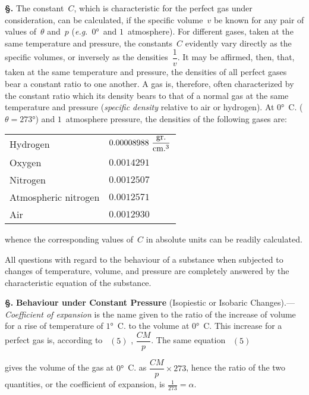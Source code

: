 \documentclass[12pt]{book}[2005/09/16]
\newcommand{\TableFont}{\footnotesize}%
\newcommand{\Section}[1]{
  \medskip\par\textbf{§\;#1}
  \label{section:#1}
}
\newcommand{\Eq}[1]{%
  \hyperref[eqn:#1]{\ensuremath{#1}}%
}
\newcommand{\PageSep}[1]{\ignorespaces}
\newcommand{\Topic}[1]{\textbf{#1}}
\newcommand{\eg}{\emph{e.g.}}
\newcommand{\Unit}[1]{\text{\upshape #1}}
\begin{document}
\Section{11.} The constant~$C$, which is characteristic for the
perfect gas under consideration, can be calculated, if the
specific volume~$v$ be known for any pair of values of~$\theta$ and~$p$
(\eg\ $0°$~and $1$~atmosphere). For different gases, taken at
the same temperature and pressure, the constants~$C$ evidently
vary directly as the specific volumes, or inversely as the
densities~$\dfrac{1}{v}$. It may be affirmed, then, that, taken at the
same temperature and pressure, the densities of all perfect
gases bear a constant ratio to one another. A gas is,
therefore, often characterized by the constant ratio which its
\PageSep{7}
density bears to that of a normal gas at the same temperature
%
and pressure (\emph{specific density} relative to air or hydrogen).
%
At $0°$~C. ($\theta = 273°$) and $1$~atmosphere pressure, the densities
of the following gases are:
\begin{center}
\TableFont
\begin{tabular}{ll}
Hydrogen & $0.00008988~\dfrac{\Unit{gr.}}{\Unit{cm.}^{3}}$ \\
Oxygen & $0.0014291$ \\
Nitrogen & $0.0012507$ \\
Atmospheric nitrogen & $0.0012571$ \\
Air & $0.0012930$ \\
\end{tabular}
\end{center}
whence the corresponding values of~$C$ in absolute units can
be readily calculated.

All questions with regard to the behaviour of a substance
when subjected to changes of temperature, volume, and
pressure are completely answered by the characteristic
equation of the substance.

\Section{12.} \Topic{Behaviour under Constant Pressure} (Isopiestic
or Isobaric Changes).---\emph{Coefficient of expansion} is the name
%
%
%
%
%
%
%
%
%
given to the ratio of the increase of volume for a rise of
temperature of $1°$~C. to the volume at $0°$~C\@. This increase
for a perfect gas is, according to~\Eq{(5)}, $\dfrac{CM}{p}$. The same equation~\Eq{(5)}
gives the volume of the gas at $0°$~C. as $\dfrac{CM}{p} × 273$,
hence the ratio of the two quantities, or the coefficient of
expansion, is $\frac{1}{273} = \alpha$.
\end{document}
